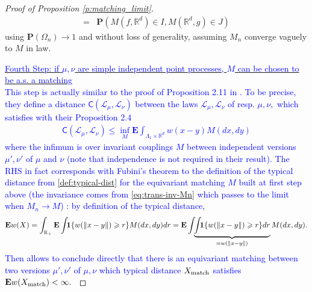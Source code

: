 \documentclass[12pt]{article}
\newcommand{\1}{\mathbf{1}}
\newcommand{\RL}[1]{\textcolor{blue}{#1}}
\newcommand{\dy}[1]{\textcolor{blue}{#1}}
\newcommand{\RL}[1]{#1}%
\newcommand{\dy}[1]{#1}%
\begin{document}
{{{{{\begin{proof}[Proof of Proposition \ref{p:matching_limit}]
{\begin{align*}
= & \mathbf{P}(M(f,\mathbb{R}^d)\in I,M(\mathbb{R}^d ,g)\in  J)
\end{align*}
using $ \mathbf{P}(\Omega _{n})\to 1$ {and without loss of generality, assuming $M_n$ converge vaguely to $M$ in law.}} 

\underline {\RL{Fourth Step: if $ \mu ,\nu $ are simple independent point processes, $ M$ can be chosen to be a.s. a matching}}  \\

\RL{This step is actually similar to the proof of Proposition 2.11 in  \cite{erbar2023optimal}. %
To be  precise, they define a distance   $   \mathsf C(  \mathscr  L_{ \mu },  \mathscr  L_{ \nu })$ between the laws $  \mathscr  L_{ \mu },  \mathscr  L_{ \nu }$ of resp. $ \mu ,\nu ,$ which satisfies with their Proposition 2.4
\begin{align*}
  \mathsf C(  \mathscr  L_{ \mu },  \mathscr  L_{ \nu })\leqslant \inf_{ M}\mathbf E \int_{\Lambda _{ 1} \times \mathbb{R}^{ d}}w(x-y) M(dx,dy)
\end{align*}
where the infimum is over \dy{  invariant} couplings $ M$ between independent versions $ \mu ',\nu '$ of $ \mu $ and $ \nu $ (note that independence is not required in their result). The RHS in fact corresponds with Fubini's theorem  to the definition of the typical distance from  \eqref{def:typical-dist} for the equivariant matching $ M$ built at   first step above \RL{(the invariance     comes from  \eqref{eq:trans-inv-Mn} which passes to the limit when $ M_{ n}\to M$)} : by definition of the typical distance,
\begin{align*}
\mathbf E w(X) = \int_{\mathbb{R}_{  + }}\mathbf E \int_{}{\bf 1}\{ w(\|x-y\|)\geqslant r \}M(dx,dy) dr= \mathbf E\int_{} \underbrace{\int_{}{\bf 1}\{w (\|x-y\|)\geqslant r \}dr}_{ = w(\|x-y\|)}M(dx,dy).\end{align*}}\RL{
Then  \cite[Proposition 2.11]{erbar2023optimal} allows to conclude directly that there is an equivariant matching between two versions $ \mu ',\nu '$ of $ \mu ,\nu $ which typical distance $ X_{ \text{\rm{match}}}$ satisfies $ \mathbf E w(X_{ \text{\rm{match}}})<\infty .$
}
\end{proof}

}}}}}
\end{document}
